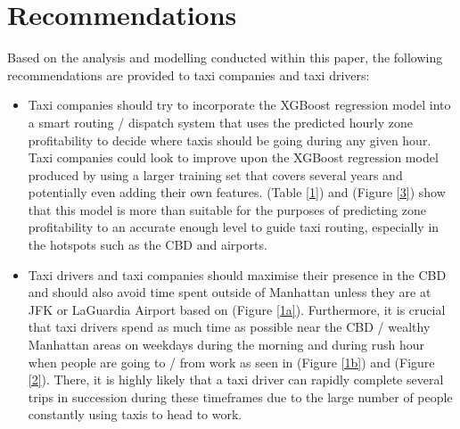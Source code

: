 \documentclass[11pt]{article}
\begin{document}
\section{Recommendations}
Based on the analysis and modelling conducted within this paper, the following recommendations are provided to taxi companies and taxi drivers:
\begin{itemize} 
    \item Taxi companies should try to incorporate the XGBoost regression model into a smart routing / dispatch system that uses the predicted hourly zone profitability to decide where taxis should be going during any given hour. Taxi companies could look to improve upon the XGBoost regression model produced by using a larger training set that covers several years and potentially even adding their own features. (Table \ref{1}) and (Figure \ref{3}) show that this model is more than suitable for the purposes of predicting zone profitability to an accurate enough level to guide taxi routing, especially in the hotspots such as the CBD and airports.
    \item Taxi drivers and taxi companies should maximise their presence in the CBD and should also avoid time spent outside of Manhattan unless they are at JFK or LaGuardia Airport based on (Figure \ref{1a}). Furthermore, it is crucial that taxi drivers spend as much time as possible near the CBD / wealthy Manhattan areas on weekdays during the morning and during rush hour when people are going to / from work as seen in (Figure \ref{1b}) and (Figure \ref{2}). There, it is highly likely that a taxi driver can rapidly complete several trips in succession during these timeframes due to the large number of people constantly using taxis to head to work. 
\end{itemize} 

\clearpage

\printbibliography
\end{document}
